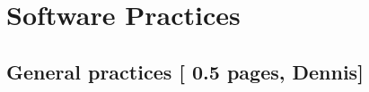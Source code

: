 \section{Software Practices}\label{sec:algorithm}

\subsection{General practices [{\color{red} 0.5 pages, Dennis}]}
 




